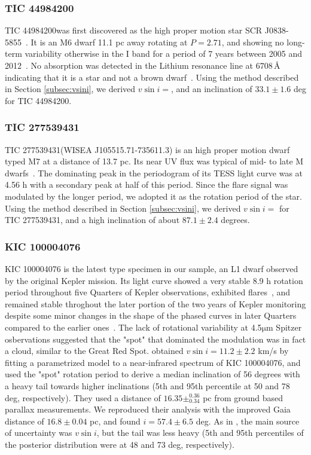 \documentclass[fleqn,usenatbib,letters]{mnras}%
\newcommand{\FA}{TIC 277539431} %
\newcommand{\FB}{TIC 44984200} %
\newcommand{\FE}{KIC 100004076} %
\begin{document}
\subsubsection{\FB}
\label{sec:propsB}
\FB\;was first discovered as the high proper motion star SCR J0838-5855~\citep{finch2007}. It is an M6 dwarf 11.1 pc away rotating at $P=2.71$, and showing no long-term variability otherwise in the I band for a period of 7 years between 2005 and 2012~\citep{hosey2015}. No absorption was detected in the Lithium resonance line at $6708$\,\AA\; indicating that it is a star and not a brown dwarf~\citep{phanbao2017}. Using the method described in Section \ref{subsec:vsini}, we derived $v\sin i=$, and an inclination of $33.1\pm1.6$ deg for \FB.
\subsubsection{\FA}
\label{sec:propsA}
\FA\;(WISEA J105515.71-735611.3) is an high proper motion dwarf~\citep{schneider2016} typed M7 at a distance of 13.7 pc. Its near UV flux was typical of mid- to late M dwarfs~\citep{schneider2018}. The dominating peak in the periodogram of its TESS light curve was at 4.56 h with a secondary peak at half of this period. Since the flare signal was modulated by the longer period, we adopted it as the rotation period of the star. Using the method described in Section \ref{subsec:vsini}, we derived $v\sin i=$ for \FA, and a high inclination of about $87.1\pm2.4$ degrees.

\subsubsection{\FE}
\label{sec:propsE}
\FE\; is the latest type specimen in our sample, an L1 dwarf observed by the original Kepler mission. Its light curve showed a very stable 8.9 h rotation period throughout five Quarters of Kepler observations, exhibited flares~\citep{gizis2013}, and remained stable throghout the later portion of the two years of Kepler monitoring despite some minor changes in the shape of the phased curves in later Quarters compared to the earlier ones~\citep{gizis2015}. The lack of rotational variability at 4.5$\mathrm{\mu}$m Spitzer osbervations suggested that the "spot" that dominated the modulation was in fact a cloud, similar to the Great Red Spot\citep{gizis2015}. \citet{gizis2013} obtained $v\sin i = 11.2\pm2.2$ km/s by fitting a parametrized model to a near-infrared spectrum of \FE, and used the "spot" rotation period to derive a median inclination of 56 degrees with a heavy tail towards higher inclinations (5th and 95th percentile at 50 and 78 deg, respectively). They used a distance of $16.35 \pm^{0.36}_{0.34}$ pc from ground based parallax measurements. We reproduced their analysis with the improved Gaia distance of $16.8\pm0.04$ pc, and found $i=57.4 \pm 6.5$ deg. As in \citet{gizis2013}, the main source of uncertainty was $v\sin i$, but the tail was less heavy (5th and 95th percentiles of the posterior distribution were at 48 and 73 deg, respectively).
\end{document}
